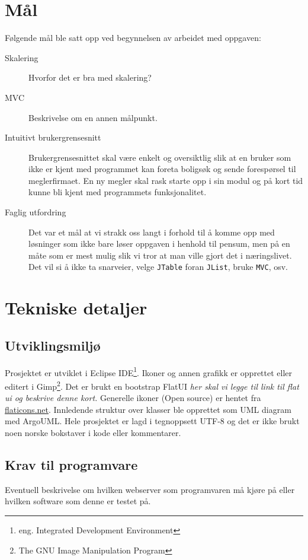 \section{Mål}
Følgende mål ble satt opp ved begynnelsen av arbeidet med oppgaven:
\begin{description}
\item[Skalering]
Hvorfor det er bra med skalering?
\item[MVC]
Beskrivelse om en annen målpunkt.
\item[Intuitivt brukergrensesnitt]
Brukergrensesnittet skal være enkelt og oversiktlig slik at en bruker som ikke er kjent med programmet kan foreta boligsøk og sende forespørsel til meglerfirmaet. En ny megler skal rask starte opp i sin modul og på kort tid kunne bli kjent med programmets funksjonalitet.
\item[Faglig utfordring]
Det var et mål at vi strakk oss langt i forhold til å komme opp med løsninger som ikke bare løser oppgaven i henhold til pensum, men på en måte som er mest mulig slik vi tror at man ville gjort det i næringslivet. Det vil si å ikke ta snarveier, velge \texttt{JTable} foran \texttt{JList}, bruke \texttt{MVC}, osv.
\end{description}

\section{Tekniske detaljer}

\subsection{Utviklingsmiljø} \label{subssec:utvmiljo}
Prosjektet er utviklet i Eclipse IDE\footnote{eng. Integrated Development
Environment}. Ikoner og annen grafikk er opprettet eller editert i Gimp\footnote{The GNU Image Manipulation Program}.
Det er brukt en bootstrap FlatUI \emph{her skal vi legge til link til flat ui
og beskrive denne kort.} Generelle ikoner (Open source) er hentet fra
\href{http://www.flaticons.net}{flaticons.net}. Innledende struktur over klasser ble opprettet som UML diagram med ArgoUML.
Hele prosjektet er lagd i tegnoppsett UTF-8 og det er ikke brukt noen norske bokstaver i kode eller kommentarer.

\subsection{Krav til programvare}
Eventuell beskrivelse om hvilken webserver som programvaren må kjøre på eller
hvilken software som denne er testet på.

